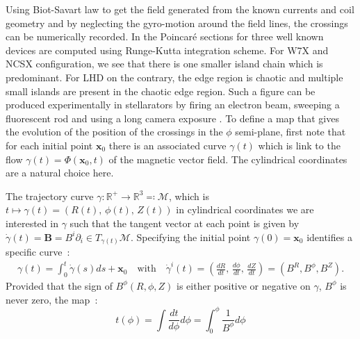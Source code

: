 Using Biot-Savart law to get the field generated from the known currents and coil geometry and by neglecting the gyro-motion around the field lines, the crossings can be numerically recorded. In  the Poincaré sections for three well known devices are computed using Runge-Kutta integration scheme. For W7X and NCSX configuration, we see that there is one smaller island chain which is predominant. For LHD on the contrary, the edge region is chaotic and multiple small islands are present in the chaotic edge region. Such a figure can be produced experimentally in stellarators by firing an electron beam, sweeping a fluorescent rod and using a long camera exposure \cite{pedersen_confirmation_2016}. To define a map that gives the evolution of the position of the crossings in the $\phi$ semi-plane, first note that for each initial point $\textbf{x}_0$ there is an associated curve $\gamma(t)$ which is link to the flow $\gamma(t) = \Phi(\textbf{x}_0, t)$ of the magnetic vector field. The cylindrical coordinates are a natural choice here.\\[5pt]

\noindent
{}

The trajectory curve $\gamma : \mathbb{R}^+ \rightarrow \mathbb{R}^3 \eqqcolon \mathcal{M}$, which is $t \mapsto \gamma(t) = (R(t),\,\phi(t),\,Z(t))$ in cylindrical coordinates  we are interested in $\gamma$ such that the tangent vector at each point is given by $\dot{\gamma}(t)= \textbf{B} = B^i\partial_i \in T_{\gamma(t)}\mathcal{M}$. Specifying the initial point $\gamma(0) = \textbf{x}_0$ identifies a specific curve~:
\begin{align*}
    \gamma(t) = \int_0^t\dot{\gamma}(s)ds + \textbf{x}_0 \quad \text{with} \quad   \dot{\gamma}^i(t)= (\frac{dR}{dt},\,\frac{d\phi}{dt},\,\frac{dZ}{dt}) = (B^R, B^\phi, B^Z).
\end{align*}
Provided that the sign of $B^\phi(R, \phi, Z)$ is either positive or negative on $\gamma$, $B^\phi$ is never zero, the map~:
\begin{equation*}
    t(\phi) = \int \frac{dt}{d\phi}d\phi = \int_0^\phi \frac{1}{B^\phi}d\phi
\end{equation*}

